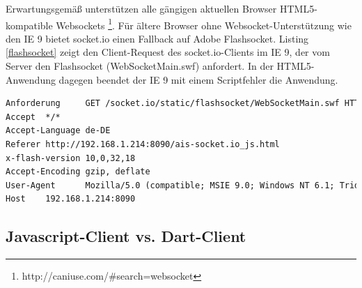 Erwartungsgemäß unterstützen alle gängigen aktuellen Browser HTML5-kompatible Websockets \footnote{http://caniuse.com/\#search=websocket}. Für ältere Browser ohne Websocket-Unterstützung wie den IE 9 bietet socket.io einen Fallback auf Adobe Flashsocket. Listing \ref{flashsocket} zeigt den Client-Request des socket.io-Clients im IE 9, der vom Server den Flashsocket (WebSocketMain.swf) anfordert. In der HTML5-Anwendung dagegen beendet der IE 9  mit einem Scriptfehler die Anwendung.\\
\begin{lstlisting}[language=html,caption=socket.io Client-Request in Internet Explorer 9, label=flashsocket]
Anforderung     GET /socket.io/static/flashsocket/WebSocketMain.swf HTTP/1.1
Accept  */*
Accept-Language de-DE
Referer http://192.168.1.214:8090/ais-socket.io_js.html
x-flash-version 10,0,32,18
Accept-Encoding gzip, deflate
User-Agent      Mozilla/5.0 (compatible; MSIE 9.0; Windows NT 6.1; Trident/5.0)
Host    192.168.1.214:8090                            
\end{lstlisting}

\newpage
\subsection{Javascript-Client vs. Dart-Client} 
